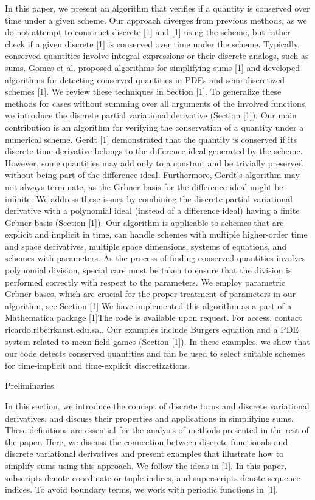 \documentclass{article}
\begin{document}
{In this paper, we present an algorithm that verifies if a quantity is conserved over time under a given scheme. Our approach diverges from previous methods, as we do not attempt to construct discrete [1] and [1] using the scheme, but rather check if a given discrete [1] is conserved over time under the scheme. Typically, conserved quantities involve integral expressions or their discrete analogs, such as sums. Gomes et al. proposed algorithms for simplifying sums [1] and developed algorithms for detecting conserved quantities in PDEs and semi-discretized schemes [1]. We review these techniques in Section [1].
To generalize these methods for cases without summing over all arguments of the involved functions, we introduce the discrete partial variational derivative (Section [1]). Our main contribution is an algorithm for verifying the conservation of a quantity under a numerical scheme. Gerdt [1] demonstrated that the quantity is conserved if its discrete time derivative belongs to the difference ideal generated by the scheme. However, some quantities may add only to a constant and be trivially preserved without being part of the difference ideal. Furthermore, Gerdt's algorithm may not always terminate, as the Gr{}bner basis for the difference ideal might be infinite.
We address these issues by combining the discrete partial variational derivative with a polynomial ideal (instead of a difference ideal) having a finite Gr{}bner basis (Section [1]). Our algorithm is applicable to schemes that are explicit and implicit in time, can handle schemes with multiple higher-order time and space derivatives, multiple space dimensions, systems of equations, and schemes with parameters.
As the process of finding conserved quantities involves polynomial division, special care must be taken to ensure that the division is performed correctly with respect to the parameters. We employ parametric Gr{}bner  bases, which are crucial for the proper treatment of parameters in our algorithm, see Section [1]
 We have implemented this algorithm as a part of a {Mathematica} package [1]{The code is available upon request. For access, contact ricardo.ribeirkaust.edu.sa.}. Our examples include Burgers equation and a PDE system related to mean-field games (Section [1]). In these examples, 
 we show that our code detects conserved quantities and can be used to select suitable schemes for time-implicit and time-explicit discretizations. 

Preliminaries.




In this section, we introduce the concept of discrete torus and discrete variational derivatives, and discuss their properties and applications in simplifying sums. 
These definitions are essential for the analysis of methods presented in the rest of the paper.
Here, we 
discuss the connection between discrete functionals and discrete variational derivatives and present examples that illustrate how to simplify sums using this approach.
We follow the ideas in [1].
In this paper, subscripts denote coordinate or tuple indices, and superscripts denote sequence indices.
To avoid boundary terms, we work with periodic functions in [1].

}
\end{document}
